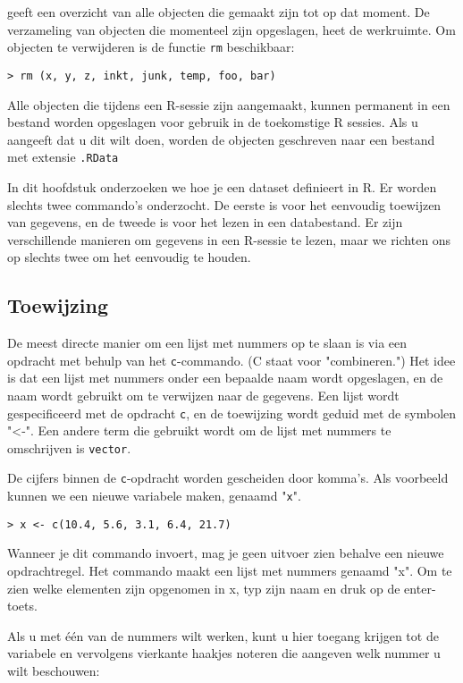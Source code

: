 geeft een overzicht van alle objecten die gemaakt zijn tot op dat moment.
De verzameling van objecten die momenteel zijn opgeslagen, heet de werkruimte.
Om objecten te verwijderen is de functie \texttt{rm} beschikbaar:

\begin{lstlisting}
> rm (x, y, z, inkt, junk, temp, foo, bar)
\end{lstlisting}

Alle objecten die tijdens een R-sessie zijn aangemaakt, kunnen permanent in een bestand worden opgeslagen voor gebruik in de toekomstige
R sessies. Als u aangeeft dat u dit wilt doen, worden de objecten geschreven naar een bestand met extensie \texttt{.RData}

In dit hoofdstuk onderzoeken we hoe je een dataset definieert in R. Er worden slechts twee commando's onderzocht. De eerste is voor het eenvoudig toewijzen van gegevens, en de tweede is voor het lezen in een databestand. Er zijn verschillende manieren om gegevens in een R-sessie te lezen, maar we richten ons op slechts twee om het eenvoudig te houden.

\subsection{Toewijzing}

De meest directe manier om een lijst met nummers op te slaan is via een opdracht met behulp van het \texttt{c}-commando. (C staat voor "combineren.") Het idee is dat een lijst met nummers onder een bepaalde naam wordt opgeslagen, en de naam wordt gebruikt om te verwijzen naar de gegevens. Een lijst wordt gespecificeerd met de opdracht \texttt{c}, en de toewijzing wordt geduid met de symbolen "<-". Een andere term die gebruikt wordt om de lijst met nummers te omschrijven is \texttt{vector}.

De cijfers binnen de \texttt{c}-opdracht worden gescheiden door komma's. Als voorbeeld kunnen we een nieuwe variabele maken, genaamd "\texttt{x}".

\begin{lstlisting}
> x <- c(10.4, 5.6, 3.1, 6.4, 21.7)
\end{lstlisting}

Wanneer je dit commando invoert, mag je geen uitvoer zien behalve een nieuwe opdrachtregel. Het commando maakt een lijst met nummers genaamd "x". Om te zien welke elementen zijn opgenomen in x, typ zijn naam en druk op de enter-toets.

Als u met één van de nummers wilt werken, kunt u hier toegang krijgen tot de variabele en vervolgens vierkante haakjes noteren die aangeven welk nummer u wilt beschouwen:

